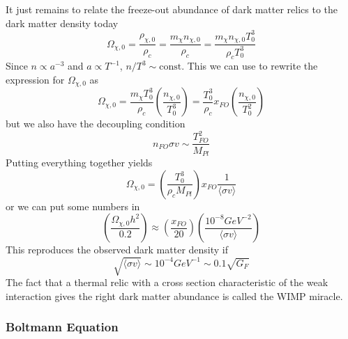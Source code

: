 It just remains to relate the freeze-out abundance of dark matter relics to the dark matter density today
\begin{equation}
    \Omega_{\chi,0} = \frac{\rho_{\chi,0}}{\rho_{c}} = \frac{m_{\chi}n_{\chi,0}}{\rho_{c}} = \frac{m_{\chi}n_{\chi,0}T_{0}^{3}}{\rho_{c}T_{0}^{3}}
\end{equation}
Since $n\propto a^{-3}$ and $a\propto T^{-1}$, $n/T^{3}\sim \text{const.}$ This we can use to rewrite the expression for $\Omega_{\chi,0}$ as 
\begin{equation}
    \Omega_{\chi,0} = \frac{m_{\chi}T_{0}^{3}}{\rho_{c}}\left(\frac{n_{\chi,0}}{T_{0}^{3}}\right) = \frac{T_{0}^{3}}{\rho_{c}}x_{FO}\left(\frac{n_{\chi,0}}{T_{0}^{2}}\right)
\end{equation}
but we also have the decoupling condition 
\begin{equation}
    n_{FO}\sigma v \sim \frac{T_{FO}^{2}}{M_{Pl}}
\end{equation}
Putting everything together yields
\begin{equation}
    \Omega_{\chi,0} = \left(\frac{T_{0}^{3}}{\rho_{c}M_{Pl}}\right)x_{FO}\frac{1}{\langle \sigma v \rangle}
\end{equation}
or we can put some numbers in 
\begin{equation}
    \boxed{
        \left(\frac{\Omega_{\chi,0}h^{2}}{0.2}\right) \approx \left(\frac{x_{FO}}{20}\right)\left(\frac{10^{-8}\unit{GeV}^{-2}}{\langle \sigma v \rangle}\right)
    }
    \label{eq:wimpsmiracle}
\end{equation}
This reproduces the observed dark matter density if
\begin{equation}
    \sqrt{\langle \sigma v \rangle} \sim 10^{-4}\unit{GeV}^{-1} \sim 0.1 \sqrt{G_{F}}
\end{equation}
The fact that a thermal relic with a cross section characteristic of the weak interaction gives the right dark matter abundance is called the WIMP miracle.

\subsubsection{Boltmann Equation}

